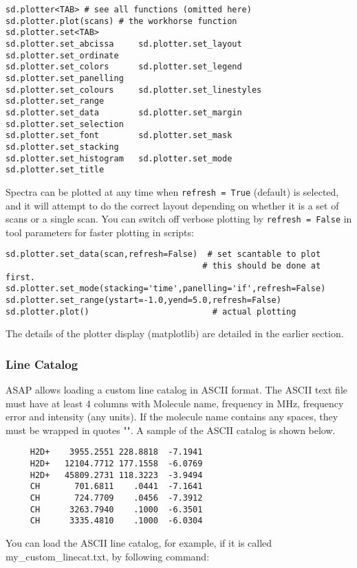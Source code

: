 \small
\begin{verbatim}
sd.plotter<TAB> # see all functions (omitted here)
sd.plotter.plot(scans) # the workhorse function
sd.plotter.set<TAB>
sd.plotter.set_abcissa     sd.plotter.set_layout      sd.plotter.set_ordinate
sd.plotter.set_colors      sd.plotter.set_legend      sd.plotter.set_panelling
sd.plotter.set_colours     sd.plotter.set_linestyles  sd.plotter.set_range
sd.plotter.set_data        sd.plotter.set_margin      sd.plotter.set_selection
sd.plotter.set_font        sd.plotter.set_mask        sd.plotter.set_stacking
sd.plotter.set_histogram   sd.plotter.set_mode        sd.plotter.set_title
\end{verbatim}
\normalsize

Spectra can be plotted at any time when {\tt refresh = True} (default) is
selected, and it will attempt to do the correct layout depending on
whether it is a set of scans or a single scan. 
You can switch off verbose plotting by {\tt refresh = False} in
tool parameters for faster plotting in scripts: 


\begin{verbatim}
sd.plotter.set_data(scan,refresh=False)  # set scantable to plot
                                        # this should be done at first.
sd.plotter.set_mode(stacking='time',panelling='if',refresh=False)
sd.plotter.set_range(ystart=-1.0,yend=5.0,refresh=False)
sd.plotter.plot()                         # actual plotting
\end{verbatim}

The details of the plotter display (matplotlib) are detailed in
the earlier section.

\subsubsection{Line Catalog}
ASAP allows loading a custom line catalog in ASCII format.
The ASCII text file must have at least 4 columns with Molecule name, 
frequency in MHz, frequency error and intensity (any units).
If the molecule name contains any spaces, they must be wrapped in quotes "".
A sample of the ASCII catalog is shown below.

\small
\begin{verbatim}
     H2D+    3955.2551 228.8818  -7.1941  
     H2D+   12104.7712 177.1558  -6.0769  
     H2D+   45809.2731 118.3223  -3.9494  
     CH       701.6811    .0441  -7.1641  
     CH       724.7709    .0456  -7.3912  
     CH      3263.7940    .1000  -6.3501  
     CH      3335.4810    .1000  -6.0304
\end{verbatim}
\normalsize
You can load the ASCII line catalog, for example, if
it is called my\_custom\_linecat.txt,
by following command:

